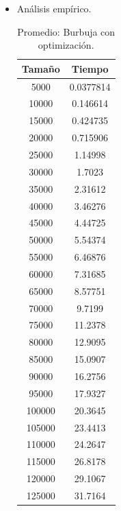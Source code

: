 \documentclass[a4paper,12pt,twoside]{article} %
\begin{document}
\begin{itemize}
	
	\item Análisis empírico.
	
\begin{table}[h]
	\begin{center}
		\begin{tabular}{|c|c|}
		\hline
		Tamaño & Tiempo \\
		\hline
		5000 & 0.0377814 \\
		10000 & 0.146614 \\
		15000 & 0.424735 \\
		20000 & 0.715906 \\
		25000 & 1.14998 \\
		30000 & 1.7023 \\
		35000 & 2.31612 \\
		40000 & 3.46276 \\
		45000 & 4.44725 \\
		50000 & 5.54374 \\
		55000 & 6.46876 \\
		60000 & 7.31685 \\
		65000 & 8.57751 \\
		70000 & 9.7199 \\
		75000 & 11.2378 \\
		80000 & 12.9095 \\
		85000 & 15.0907 \\
		90000 & 16.2756 \\
		95000 & 17.9327 \\
		100000 & 20.3645 \\
		105000 & 23.4413 \\
		110000 & 24.2647 \\
		115000 & 26.8178 \\
		120000 & 29.1067 \\
		125000 & 31.7164 \\
		\hline
		\end{tabular}
	\end{center}
	\caption{Promedio: Burbuja con optimización.}
\end{table}

\newpage

\begin{figure}[h]
  \begin{center}
  

\end{center}
\end{figure}
\end{itemize}
\end{document}
